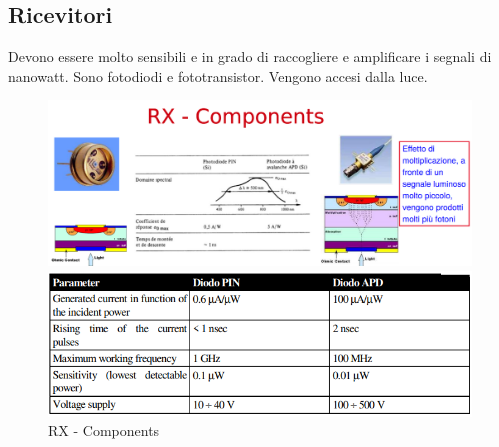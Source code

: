 \documentclass[8pt]{extarticle}
\begin{document}
\subsection{Ricevitori}
Devono essere molto sensibili e in grado di raccogliere e amplificare i segnali di nanowatt. Sono fotodiodi e fototransistor. Vengono accesi dalla luce.
\begin{figure}[H]
    \centering
    \begin{minipage}[c]{\linewidth}
        \begin{minipage}[l]{0.48\linewidth}
            \includegraphics[width=\linewidth]{images/FO11.png}
        \end{minipage}
        \hspace{0.04\linewidth}
        \begin{minipage}[l]{0.48\linewidth}
            \includegraphics[width=\linewidth]{images/FO12.png}
        \end{minipage}
        \caption{RX - Components}\label{fig:1}
    \end{minipage}
\end{figure}
\end{document}
